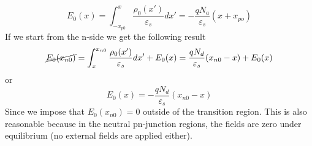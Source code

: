     \begin{equation} 
        {E_0}(x) = \int_{ - {x_{p0}}}^x {\frac{{{\rho _0}(x')}}{{{\varepsilon _s}}}dx'} = - \frac{{q{N_a}}}{{{\varepsilon _s}}}(x + {x_{po}}) 
    \end{equation}
If we start from the n-side we get the following result
    \begin{equation} 
        \cancel{{E_0}({x_{n0}})} = \int_x^{{x_{n0}}} {\frac{{{\rho _0}(x')}}{{{\varepsilon _s}}}dx'}  + {E_0}(x) = \frac{{q{N_d}}}{{{\varepsilon _s}}}({x_{n0}} - x) + {E_0}(x) 
    \end{equation}
or
    \begin{equation} 
        E_0(x) =  - \frac{{q{N_d}}}{{{\varepsilon _s}}}({x_{n0}} - x)
    \end{equation}
Since we impose that $E_0(x_{n0}) = 0$ outside of the transition region.  This is also reasonable because in the neutral pn-junction regions, the fields are zero under equilibrium (no external fields are applied either).  

